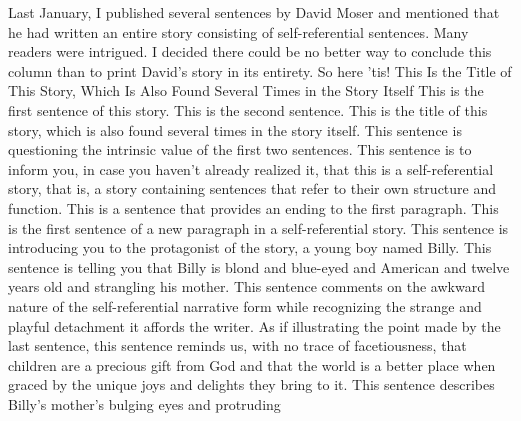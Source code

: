 Last January, I published several sentences by David Moser and mentioned that he had written an entire story consisting of self-referential sentences. Many readers were intrigued. I decided there could be no better way to conclude this column than to print David's story in its entirety. So here 'tis! 
This Is the Title of This Story, Which Is Also Found Several Times in the Story Itself This is the first sentence of this story. This is the second sentence. This is the title of this story, which is also found several times in the story itself. This sentence is questioning the intrinsic value of the first two sentences. This sentence is to inform you, in case you haven't already realized it, that this is a self-referential story, that is, a story containing sentences that refer to their own structure and function. This is a sentence that provides an ending to the first paragraph. This is the first sentence of a new paragraph in a self-referential story. This sentence is introducing you to the protagonist of the story, a young boy named Billy. This sentence is telling you that Billy is blond and blue-eyed and American and twelve years old and strangling his mother. This sentence comments on the awkward nature of the self-referential narrative form while recognizing the strange and playful detachment it affords the writer. As if illustrating the point made by the last sentence, this sentence reminds us, with no trace of facetiousness, that children are a precious gift from God and that the world is a better place when graced by the unique joys and delights they bring to it. This sentence describes Billy's mother's bulging eyes and protruding 



